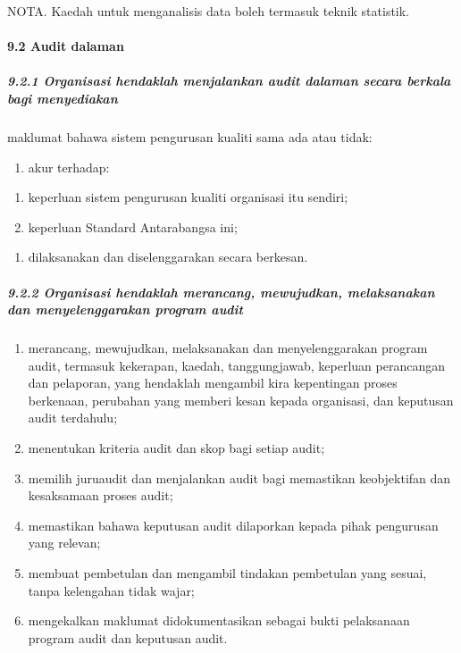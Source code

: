 \documentclass[
]{article}
\providecommand{\tightlist}{%
  \setlength{\itemsep}{0pt}\setlength{\parskip}{0pt}}
\begin{document}
NOTA. Kaedah untuk menganalisis data boleh termasuk teknik statistik.

\hypertarget{audit-dalaman}{%
\paragraph{9.2 Audit dalaman}\label{audit-dalaman}}

\hypertarget{organisasi-hendaklah-menjalankan-audit-dalaman-secara-berkala-bagi-menyediakan}{%
\subparagraph{9.2.1 Organisasi hendaklah menjalankan audit dalaman
secara berkala bagi
menyediakan}\label{organisasi-hendaklah-menjalankan-audit-dalaman-secara-berkala-bagi-menyediakan}}

maklumat bahawa sistem pengurusan kualiti sama ada atau tidak:

\begin{enumerate}
\def\labelenumi{\alph{enumi})}
\tightlist
\item
  akur terhadap:
\end{enumerate}

\begin{enumerate}
\def\labelenumi{\arabic{enumi})}
\item
  keperluan sistem pengurusan kualiti organisasi itu sendiri;
\item
  keperluan Standard Antarabangsa ini;
\end{enumerate}

\begin{enumerate}
\def\labelenumi{\alph{enumi})}
\setcounter{enumi}{1}
\tightlist
\item
  dilaksanakan dan diselenggarakan secara berkesan.
\end{enumerate}

\hypertarget{organisasi-hendaklah-merancang-mewujudkan-melaksanakan-dan-menyelenggarakan-program-audit}{%
\subparagraph{9.2.2 Organisasi hendaklah merancang, mewujudkan,
melaksanakan dan menyelenggarakan program
audit}\label{organisasi-hendaklah-merancang-mewujudkan-melaksanakan-dan-menyelenggarakan-program-audit}}

\begin{enumerate}
\def\labelenumi{\alph{enumi})}
\item
  merancang, mewujudkan, melaksanakan dan menyelenggarakan program
  audit, termasuk kekerapan, kaedah, tanggungjawab, keperluan
  perancangan dan pelaporan, yang hendaklah mengambil kira kepentingan
  proses berkenaan, perubahan yang memberi kesan kepada organisasi, dan
  keputusan audit terdahulu;
\item
  menentukan kriteria audit dan skop bagi setiap audit;
\item
  memilih juruaudit dan menjalankan audit bagi memastikan keobjektifan
  dan kesaksamaan proses audit;
\item
  memastikan bahawa keputusan audit dilaporkan kepada pihak pengurusan
  yang relevan;
\item
  membuat pembetulan dan mengambil tindakan pembetulan yang sesuai,
  tanpa kelengahan tidak wajar;
\item
  mengekalkan maklumat didokumentasikan sebagai bukti pelaksanaan
  program audit dan keputusan audit.
\end{enumerate}
\end{document}
